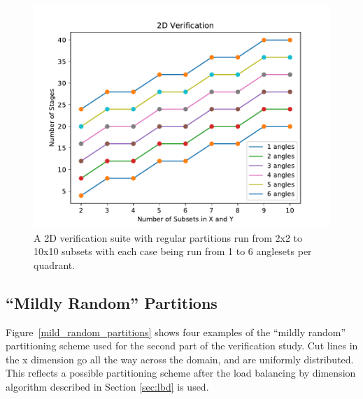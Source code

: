 \begin{figure}[H]
\centering
\includegraphics[scale=0.8]{../figures/regular_verification.pdf}
\caption{A 2D verification suite with regular partitions run from 2x2 to 10x10 subsets with each case being run from 1 to 6 anglesets per quadrant.}
\label{regular_verification}
\end{figure}

\subsection{``Mildly Random'' Partitions}
Figure~\ref{mild_random_partitions} shows four examples of the ``mildly random'' partitioning scheme used for the second part of the verification study. Cut lines in the x dimension go all the way across the domain, and are uniformly distributed. This reflects a possible partitioning scheme after the load balancing by dimension algorithm described in Section \ref{sec:lbd} is used.


